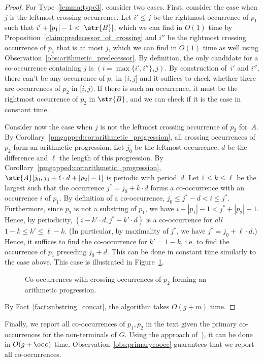\begin{proof}
For Type~\ref{lemma:type3}, consider two cases. First, consider the case when $j$ is the leftmost crossing occurrence. Let $i' \le j$ be the rightmost occurrence of $p_1$ such that $i'+|p_1|-1 < |\str{B}|$, which we can find in $O(1)$ time by Proposition~\ref{claim:predecessor_of_crossing} and $i''$ be the rightmost crossing occurrence of $p_1$ that is at most $j$, which we can find in $O(1)$ time as well using Observation~\ref{obs:arithmetic_predecessor}. By definition, the only candidate for a co-occurrence containing $j$ is $(i = \max\{i',i''\},j)$. By construction of~$i'$ and $i''$, there can't be any  occurrence of $p_1$ in $(i,j]$ and it suffices to check whether there are occurrences of $p_2$ in $[i,j)$. If there is such an occurrence, it must be the rightmost occurrence of $p_2$ in $\str{B}$, and we can check if it is the case in constant time. 

Consider now the case when $j$ is not the leftmost crossing occurrence of $p_2$ for~$A$.
By Corollary~\ref{pmgapped:cor:arithmetic_progression}, all crossing occurrences of $p_2$ form an arithmetic progression. Let $j_0$ be the leftmost occurrence, $d$ be the difference and $\ell$ the length of this progression. By Corollary~\ref{pmgapped:cor:arithmetic_progression}, $\str{A}[j_0, j_0+\ell \cdot d+|p_2|-1]$ is periodic with period~$d$. Let $1 \le k \le \ell$ be the largest such that the occurrence $j^\ast = j_0+k \cdot d$ forms a co-occurrence with an occurrence $i$ of $p_1$. By definition of a co-occurrence, $j_0 \le j^\ast-d < i \le j^\ast$. Furthermore, since $p_2$ is not a substring of $p_1$, we have $i+|p_1|-1 < j^\ast+|p_2|-1$. Hence, by periodicity, $(i-k'\cdot d, j^\ast-k' \cdot d)$ is a co-occurrence for \emph{all} $1-k \le k' \le \ell-k$. (In particular, by maximality of $j^\ast$, we have $j^\ast = j_0+\ell\cdot d$.) Hence, it suffices to find the co-occurrence for $k'=1-k$, i.e. to find the occurrence of $p_1$ preceding $j_0+d$. This can be done in constant time similarly to the case above. This case is illustrated in Figure~\ref{fig:p2_crossing_periodic}.


\begin{figure}
\centering
{}
\caption{Co-occurrences with crossing occurrences of $p_2$ forming an arithmetic progression.}
\label{fig:p2_crossing_periodic}
\end{figure}

By Fact~\ref{fact:substring_concat}, the algorithm takes $O(g+m)$ time. 

\end{proof}
    
Finally, we report all co-occurrences of $p_1,p_2$ in the text given the primary co-occurrences for the non-terminals of $G$. Using the approach of~\cite[Section 6.4]{talg/ChristiansenEKN21}), it can be done in $O(g+\occ)$ time. Observation~\ref{obs:primarycoocc} guarantees that we report all co-occurrences.
